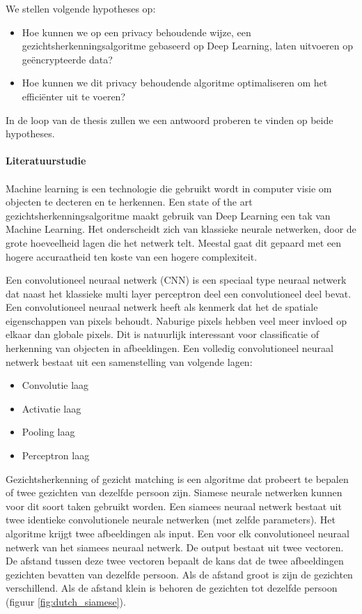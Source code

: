 We stellen volgende hypotheses op:

\begin{itemize}
  \item Hoe kunnen we op een privacy behoudende wijze, een gezichtsherkenningsalgoritme gebaseerd op Deep Learning, laten uitvoeren op ge\"encrypteerde data?
  \item Hoe kunnen we dit privacy behoudende algoritme optimaliseren om het effici\"enter uit te voeren?
\end{itemize}

In de loop van de thesis zullen we een antwoord proberen te vinden op beide hypotheses.\\\\

\textbf{\Large{Literatuurstudie}}\\\\
Machine learning is een technologie die gebruikt wordt in computer visie om objecten te decteren en te herkennen.  Een state of the art gezichtsherkenningsalgoritme maakt gebruik van Deep Learning een tak van Machine Learning. Het onderscheidt zich van klassieke neurale netwerken, door de grote hoeveelheid lagen die het netwerk telt. Meestal gaat dit gepaard met een hogere accuraatheid ten koste van een hogere complexiteit.

Een convolutioneel neuraal netwerk (CNN) is een speciaal type neuraal netwerk dat naast het klassieke multi layer perceptron deel een convolutioneel deel bevat. Een convolutioneel neuraal netwerk heeft als kenmerk dat het de spatiale eigenschappen van pixels behoudt. Naburige pixels hebben veel meer invloed op elkaar dan globale pixels. Dit is natuurlijk interessant voor classificatie of herkenning van objecten in afbeeldingen. Een volledig convolutioneel neuraal netwerk bestaat uit een samenstelling van volgende lagen:

\begin{itemize}
  \item Convolutie laag
  \item Activatie laag
  \item Pooling laag
  \item Perceptron laag
\end{itemize}

Gezichtsherkenning of gezicht matching is een algoritme dat probeert te bepalen of twee gezichten van dezelfde persoon zijn. Siamese neurale netwerken kunnen voor dit soort taken gebruikt worden. Een siamees neuraal netwerk bestaat uit twee identieke convolutionele neurale netwerken (met zelfde parameters). Het algoritme krijgt twee afbeeldingen als input. Een voor elk convolutioneel neuraal netwerk van het siamees neuraal netwerk. De output bestaat uit twee vectoren. De afstand tussen deze twee vectoren bepaalt de kans dat de twee afbeeldingen gezichten bevatten van dezelfde persoon. Als de afstand groot is zijn de gezichten verschillend. Als de afstand klein is behoren de gezichten tot dezelfde persoon (figuur \ref{fig:dutch_siamese}).

